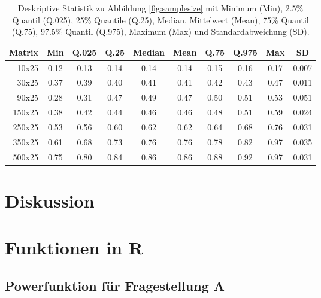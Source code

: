 \documentclass[12pt]{article} %
\begin{document}
\begin{table}[ht]
	\caption{Deskriptive Statistik zu Abbildung \ref{fig:samplesize} mit Minimum (Min), 2.5\% Quantil (Q.025), 25\% Quantile (Q.25), Median, Mittelwert (Mean), 75\% Quantil (Q.75), 97.5\% Quantil (Q.975), Maximum (Max) und Standardabweichung (SD).}
	\begin{tabular}{rccccccccc}
		\hline
		Matrix & Min & Q.025 & Q.25 & Median & Mean & Q.75 & Q.975 & Max & SD \\ 
		\hline
		10x25 & 0.12 & 0.13 & 0.14 & 0.14 & 0.14 & 0.15 & 0.16 & 0.17 & 0.007 \\ 
		30x25 & 0.37 & 0.39 & 0.40 & 0.41 & 0.41 & 0.42 & 0.43 & 0.47 & 0.011 \\ 
		90x25 & 0.28 & 0.31 & 0.47 & 0.49 & 0.47 & 0.50 & 0.51 & 0.53 & 0.051 \\ 
		150x25 & 0.38 & 0.42 & 0.44 & 0.46 & 0.46 & 0.48 & 0.51 & 0.59 & 0.024 \\ 
		250x25 & 0.53 & 0.56 & 0.60 & 0.62 & 0.62 & 0.64 & 0.68 & 0.76 & 0.031 \\ 
		350x25 & 0.61 & 0.68 & 0.73 & 0.76 & 0.76 & 0.78 & 0.82 & 0.97 & 0.035 \\ 
		500x25 & 0.75 & 0.80 & 0.84 & 0.86 & 0.86 & 0.88 & 0.92 & 0.97 & 0.031 \\ 
		\hline
	\end{tabular}
	\label{tab:samplesize}
\end{table}

\section{Diskussion}

\newpage

 

\newpage

\appendix

\section{Funktionen in R}

\subsection{Powerfunktion für Fragestellung A}

\label{powerAF}
\end{document}
